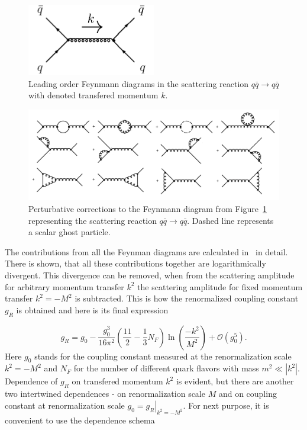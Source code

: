 \begin{figure}
  \centering
  \includegraphics[width=0.5\textwidth]{Chapter1/QuarkQuarkScattering.png} 
  \caption{Leading order Feynmann diagrams in the scattering reaction $q \bar{q}
    \rightarrow q \bar{q}$ with denoted transfered momentum $k$.}
  \label{fig:QuarkQuarkScattering}
\end{figure}

\begin{figure}[t]
  \centering
  \includegraphics[width=\textwidth]{Chapter1/QuarkQuarkCorrection.png} 
  \caption{Perturbative corrections to the Feynmann diagram from
    Figure~\ref{fig:QuarkQuarkScattering} representing the scattering reaction
    $q \bar{q} \rightarrow q \bar{q}$. Dashed line represents a scalar ghost
    particle.}
  \label{fig:QuarkQuarkScatteringCorrection}
\end{figure}

The contributions from all the Feynman diagrams are calculated in~\cite{QCDTextbook}
in detail. There is shown, that all these contributions together are
logarithmically divergent. This divergence can be removed, when from the scattering
amplitude for arbitrary momentum transfer $k^2$ the scattering amplitude for fixed
momentum transfer $k^2 = -M^2$ is subtracted. This is how the renormalized
coupling constant $g_R$ is obtained and here is its final expression 

\begin{equation}
  g_R = g_0 - \frac{g_0^3}{16\pi^2} \left( \frac{11}{2} - \frac{1}{3}N_F \right)
  \ln \left( \frac{-k^2}{M^2} \right) + \mathscr{O}(g_0^5).
  \label{eq:RenormalizedCoupling}
\end{equation}
Here $g_0$ stands for the coupling constant measured at the renormalization scale
$k^2 = -M^2$ and $N_F$ for the number of different quark flavors with mass $m^2
\ll \left| k^2 \right|$. Dependence of $g_R$ on transfered momentum $k^2$ is
evident, but there are another two intertwined dependences - on renormalization
scale $M$ and on coupling constant at renormalization scale $g_0 =
\left. g_R \right|_{k^2=-M^2}$. For next purpose, it is convenient to use the
dependence schema

